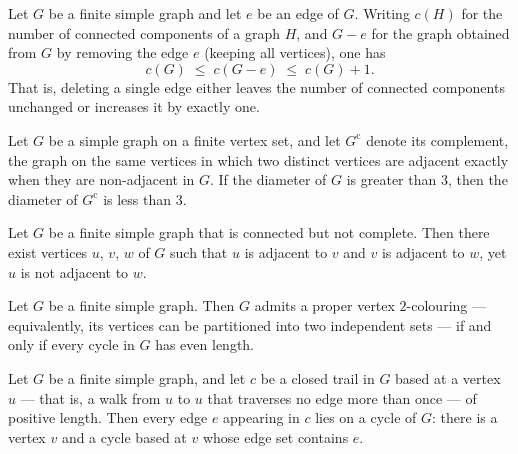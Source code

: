 \begin{theorem}
\label{SimpleGraph.components_deleteEdge}
\leanok
Let $G$ be a finite simple graph and let $e$ be an edge of $G$. Writing $c(H)$ for the
number of connected components of a graph $H$, and $G - e$ for the graph obtained from
$G$ by removing the edge $e$ (keeping all vertices), one has
\[
c(G) \;\le\; c(G - e) \;\le\; c(G) + 1 .
\]
That is, deleting a single edge either leaves the number of connected components
unchanged or increases it by exactly one.
\end{theorem}

\begin{theorem}
\label{SimpleGraph.compl_diam_lt_of_diam_gt}
\leanok
Let $G$ be a simple graph on a finite vertex set, and let $G^{\mathrm{c}}$ denote its
complement, the graph on the same vertices in which two distinct vertices are adjacent
exactly when they are non-adjacent in $G$. If the diameter of $G$ is greater than $3$,
then the diameter of $G^{\mathrm{c}}$ is less than $3$.
\end{theorem}

\begin{theorem}
\label{SimpleGraph.exists_induced_path_of_connected_not_complete}
\leanok
Let $G$ be a finite simple graph that is connected but not complete. Then there exist
vertices $u$, $v$, $w$ of $G$ such that $u$ is adjacent to $v$ and $v$ is adjacent to
$w$, yet $u$ is not adjacent to $w$.
\end{theorem}

\begin{theorem}
\label{SimpleGraph.bipartite_iff_no_odd_cycle}
\leanok
Let $G$ be a finite simple graph. Then $G$ admits a proper vertex $2$-colouring —
equivalently, its vertices can be partitioned into two independent sets — if and only if
every cycle in $G$ has even length.
\end{theorem}

\begin{theorem}
\label{SimpleGraph.edge_in_cycle_of_closed_trail}
\leanok
Let $G$ be a finite simple graph, and let $c$ be a closed trail in $G$ based at a vertex
$u$ — that is, a walk from $u$ to $u$ that traverses no edge more than once — of
positive length. Then every edge $e$ appearing in $c$ lies on a cycle of $G$: there is a
vertex $v$ and a cycle based at $v$ whose edge set contains $e$.
\end{theorem}

